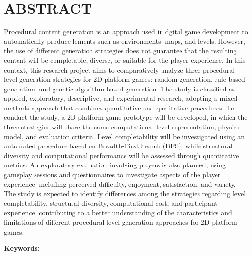 \chapter*{ABSTRACT}

Procedural content generation is an approach used in dgital game development to 
automatically produce lements such as environments, maps, and levels. However, 
the use of different generation strategies does not guarantee that the 
resulting content will be completable, diverse, or suitable for the player
experience. In this context, this research project aims to comparatively 
analyze three procedural level generation strategies for 2D platform games:
random generation, rule-based generation, and genetic algorithm-based 
generation. The study is classified as applied, exploratory, descriptive, and 
experimental research, adopting a mixed-methods approach that combines 
quantitative and qualitative procedures. To conduct the study, a 2D platform
game prototype will be developed, in which the three strategies will share the 
same computational level representation, physics model, and evaluation 
criteria. Level completability will be investigated using an automated 
procedure based on Breadth-First Search (BFS), while structural diversity and
computational performance will be assessed through quantitative metrics. 
An exploratory evaluation involving players is also planned, using gameplay
sessions and questionnaires to investigate aspects of the player experience, 
including perceived difficulty, enjoyment, satisfaction, and variety. The study 
is expected to identify differences among the strategies regarding level 
completability, structural diversity, computational cost, and participant 
experience, contributing to a better understanding of the characteristics and 
limitations of different procedural level generation approaches for 2D platform 
games.

\vspace{0.5cm}
\noindent\textbf{Keywords:} \okeywords
\cleardoublepage
